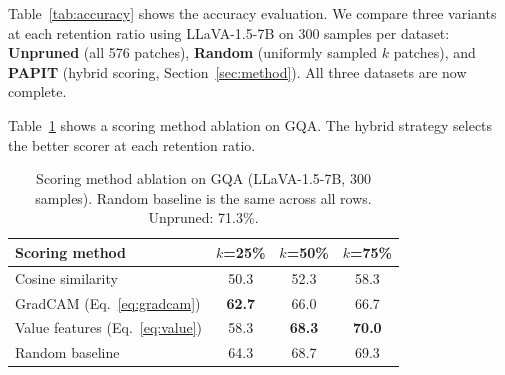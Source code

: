 \documentclass[10pt,twocolumn,letterpaper]{article}
\begin{document}
Table~\ref{tab:accuracy} shows the accuracy evaluation.
We compare three variants at each retention ratio using LLaVA-1.5-7B
on 300 samples per dataset:
\textbf{Unpruned} (all 576 patches),
\textbf{Random} (uniformly sampled $k$ patches), and
\textbf{PAPIT} (hybrid scoring, Section~\ref{sec:method}).
All three datasets are now complete.

Table~\ref{tab:ablation} shows a scoring method ablation on GQA.
The hybrid strategy selects the better scorer at each retention ratio.

\begin{table}[htbp]
\centering
\small
\caption{Scoring method ablation on GQA (LLaVA-1.5-7B, 300 samples).
         Random baseline is the same across all rows.
         Unpruned: 71.3\%.}
\label{tab:ablation}
\begin{tabular}{@{}lccc@{}}
\toprule
Scoring method & $k$=25\% & $k$=50\% & $k$=75\% \\
\midrule
Cosine similarity     & 50.3 & 52.3 & 58.3 \\
GradCAM (Eq.~\ref{eq:gradcam})
                      & \textbf{62.7} & 66.0 & 66.7 \\
Value features (Eq.~\ref{eq:value})
                      & 58.3 & \textbf{68.3} & \textbf{70.0} \\
\midrule
Random baseline       & 64.3 & 68.7 & 69.3 \\
\bottomrule
\end{tabular}
\end{table}
\end{document}

